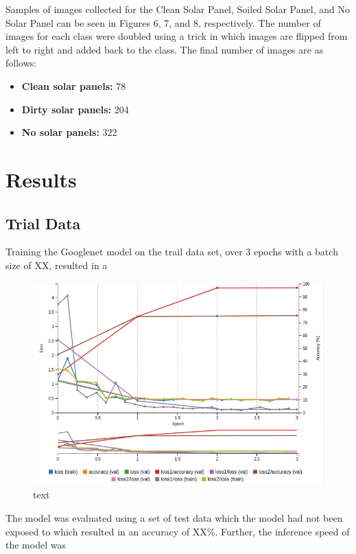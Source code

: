 \documentclass[10pt,journal,compsoc]{IEEEtran}
\begin{document}
		Samples of images collected for the Clean Solar Panel, Soiled Solar Panel, and No Solar Panel can be seen in Figures 6, 7, and 8, respectively. The number of images for each class were doubled using a trick in which images are flipped from left to right and added back to the class. The final number of images are as follows:
		\begin{itemize}
			\item \textbf{Clean solar panels:} 78
			\item \textbf{Dirty solar panels:} 204
			\item \textbf{No solar panels:} 322
		\end{itemize}
			
		\section{Results}
		\subsection{Trial Data}
		Training the Googlenet model on the trail data set, over 3 epochs with a batch size of XX, resulted in a 
		\begin{figure}[h]
			\centering
			\includegraphics[scale=0.3]{trial_data_model_train}
			\caption{text}
		\end{figure}
		
		The model was evaluated using a set of test data which the model had not been exposed to which resulted in an accuracy of XX\%. Further, the inference speed of the model was 
		
\end{document}
